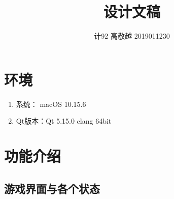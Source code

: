 \documentclass[utf-8]{ctexart}
\title{设计文稿}
\author{计92 高敬越 2019011230}
\begin{document}
    \maketitle
    \section{环境}
    \begin{enumerate}
        \item 系统： macOS 10.15.6
        \item Qt版本：Qt 5.15.0 clang 64bit 
    \end{enumerate}
    \section{功能介绍}

    \subsection{游戏界面与各个状态}
\end{document}
